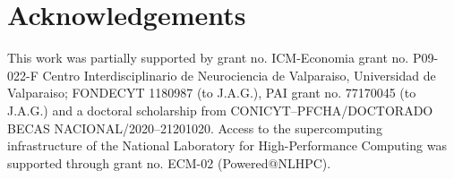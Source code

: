 \documentclass[twoside,twocolumn,9pt]{article}
\begin{document}
\section*{Acknowledgements}
This work was partially supported by grant no. ICM-Economia grant
no. P09-022-F Centro Interdisciplinario de Neurociencia de Valparaiso,
Universidad de Valparaiso; FONDECYT 1180987 (to J.A.G.), PAI grant
no. 77170045 (to J.A.G.) and a doctoral scholarship from
CONICYT--PFCHA/DOCTORADO BECAS NACIONAL/2020--21201020.  Access to the
supercomputing infrastructure of the National Laboratory for
High-Performance Computing was supported through grant no. ECM-02
(Powered@NLHPC).




\end{document}
